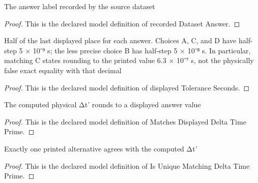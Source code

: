\begin{definition}
  \label{def:physics:phyx-mini-0598:phyxminiproblems-problemphyxmini0598-recordeddatasetanswer}
  The answer label recorded by the source dataset
\end{definition}
\begin{proof}
  This is the declared model definition of recorded Dataset Answer.
\end{proof}
\begin{definition}
  \label{def:physics:phyx-mini-0598:phyxminiproblems-problemphyxmini0598-displayedtoleranceseconds}
  Half of the last displayed place for each answer. Choices A, C, and D have half-step 5 × 10⁻⁹ s; the less precise choice B has half-step 5 × 10⁻⁸ s. In particular, matching C states rounding to the printed value 6.3 × 10⁻⁷ s, not the physically false exact equality with that decimal
\end{definition}
\begin{proof}
  This is the declared model definition of displayed Tolerance Seconds.
\end{proof}
\begin{definition}
  \label{def:physics:phyx-mini-0598:phyxminiproblems-problemphyxmini0598-matchesdisplayeddeltatimeprime}
  The computed physical Δt' rounds to a displayed answer value
\end{definition}
\begin{proof}
  This is the declared model definition of Matches Displayed Delta Time Prime.
\end{proof}
\begin{definition}
  \label{def:physics:phyx-mini-0598:phyxminiproblems-problemphyxmini0598-isuniquematchingdeltatimeprime}
  Exactly one printed alternative agrees with the computed Δt'
\end{definition}
\begin{proof}
  This is the declared model definition of Is Unique Matching Delta Time Prime.
\end{proof}
